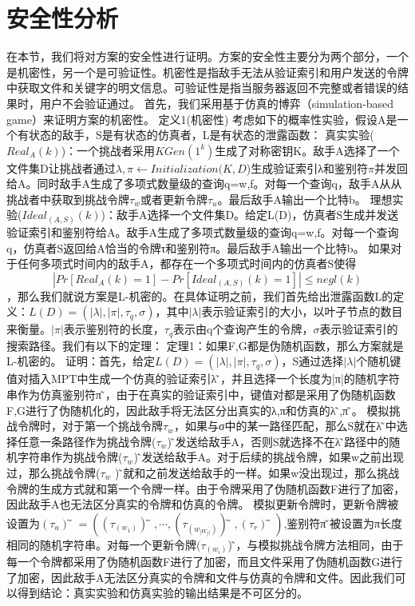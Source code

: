 \section{安全性分析}
在本节，我们将对方案的安全性进行证明。方案的安全性主要分为两个部分，一个是机密性，另一个是可验证性。机密性是指敌手无法从验证索引和用户发送的令牌中获取文件和关键字的明文信息。可验证性是指当服务器返回不完整或者错误的结果时，用户不会验证通过。
首先，我们采用基于仿真的博弈（simulation-based game）来证明方案的机密性。
定义1(机密性) 考虑如下的概率性实验，假设A是一个有状态的敌手，S是有状态的仿真者，L是有状态的泄露函数：
真实实验($Real_A (k)$)：一个挑战者采用$KGen(1^k)$生成了对称密钥K。敌手A选择了一个文件集D让挑战者通过${λ,π}←Initialization(K,D$)生成验证索引λ和鉴别符$π$并发回给A。同时敌手A生成了多项式数量级的查询q={w,f}。对每一个查询q，敌手A从从挑战者中获取到挑战令牌$τ_w$或者更新令牌$τ_u$。最后敌手A输出一个比特b。
理想实验($Ideal_(A,S) (k)$)：敌手A选择一个文件集D。给定L(D)，仿真者S生成并发送验证索引和鉴别符给A。敌手A生成了多项式数量级的查询q={w,f}。对每一个查询q，仿真者S返回给A恰当的令牌τ和鉴别符π。最后敌手A输出一个比特b。
如果对于任何多项式时间内的敌手A，都存在一个多项式时间内的仿真者S使得$$|Pr⁡[Real_A (k)=1]-Pr⁡[Ideal_(A,S) (k)=1] |≤negl(k)$$，那么我们就说方案是L-机密的。在具体证明之前，我们首先给出泄露函数L的定义：$L(D)=(|λ|,|π|,{τ}_q,{σ})$，其中$|λ|$表示验证索引的大小，以叶子节点的数目来衡量。$|π|$表示鉴别符的长度，${τ_q}$表示由q个查询产生的令牌，$\sigma$表示验证索引的搜索路径。我们有以下的定理：
定理1：如果F,G都是伪随机函数，那么方案就是L-机密的。
证明：首先，给定$L(D)=(|λ|,|π|,{τ}_q,{σ})$，S通过选择$|λ|$个随机键值对插入MPT中生成一个仿真的验证索引λ ̃，并且选择一个长度为|π|的随机字符串作为仿真鉴别符π ̃，由于在真实的验证索引中，键值对都是采用了伪随机函数F,G进行了伪随机化的，因此敌手将无法区分出真实的λ,π和仿真的λ ̃,π ̃。
模拟挑战令牌时，对于第一个挑战令牌$τ_w$，如果与{σ}中的某一路径匹配，那么S就在λ ̃中选择任意一条路径作为挑战令牌($τ_w $) ̃发送给敌手A，否则S就选择不在λ ̃路径中的随机字符串作为挑战令牌($τ_w $) ̃发送给敌手A。对于后续的挑战令牌，如果w之前出现过，那么挑战令牌($τ_w$ ) ̃就和之前发送给敌手的一样。如果w没出现过，那么挑战令牌的生成方式就和第一个令牌一样。由于令牌采用了伪随机函数F进行了加密，因此敌手A也无法区分真实的令牌和仿真的令牌。
模拟更新令牌时，更新令牌被设置为$(τ_u ) ̃=((τ_(w_1 ) ) ̃,⋯,(τ_(w_|W_f |  ) ) ̃,(τ_r ) ̃)$,鉴别符π ̃被设置为π长度相同的随机字符串。对每一个更新令牌$(τ_(w_i ) $) ̃，与模拟挑战令牌方法相同，由于每一个令牌都采用了伪随机函数F进行了加密，而且文件采用了伪随机函数G进行了加密，因此敌手A无法区分真实的令牌和文件与仿真的令牌和文件。因此我们可以得到结论：真实实验和仿真实验的输出结果是不可区分的。
